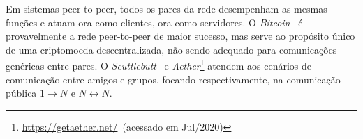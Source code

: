 \documentclass[12pt]{article}
\newcommand{\FC} {Freechains\xspace}
\newcommand{\Xon} {$1{\rightarrow}N$\xspace}
\newcommand{\Xnn} {$N{\leftrightarrow}N$\xspace}
\begin{document}

Em sistemas peer-to-peer, todos os pares da rede desempenham as mesmas funções
e atuam ora como clientes, ora como servidores.
O \emph{Bitcoin}~\cite{p2p.bitcoin} é provavelmente a rede peer-to-peer de
maior sucesso, mas serve ao propósito único de uma criptomoeda descentralizada,
não sendo adequado para comunicações genéricas entre pares.
O \emph{Scuttlebutt}~\cite{p2p.scuttlebutt} e
\emph{Aether}\footnote{\url{https://getaether.net/}~(acessado em Jul/2020)} atendem aos cenários de
comunicação entre amigos e grupos, focando respectivamente, na comunicação
pública \Xon e \Xnn.

\end{document}
